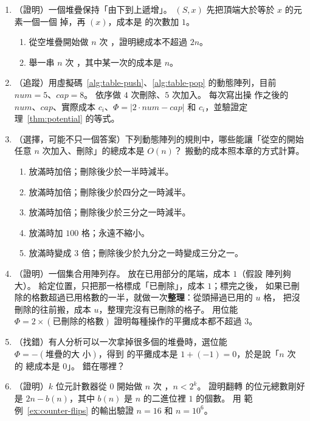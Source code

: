 \begin{enumerate}
\item （證明）一個堆疊保持「由下到上遞增」。 $(S, x)$ 先把頂端大於等於
$x$ 的元素一個一個  掉，再 $(x)$，成本是  的次數加 $1$。
\begin{enumerate}
\item 從空堆疊開始做 $n$ 次 ，證明總成本不超過 $2n$。
\item 舉一串 $n$ 次 ，其中某一次的成本是 $n$。
\end{enumerate}

\item （追蹤）用虛擬碼~\ref{alg:table-push}、\ref{alg:table-pop} 的動態陣列，目前
$\mathit{num} = 5$、$\mathit{cap} = 8$。 依序做 $4$ 次刪除、$5$ 次加入。 每次寫出操
作之後的 $\mathit{num}$、$\mathit{cap}$、實際成本 $c_i$、$\Phi = |2 \cdot \mathit{num}
- \mathit{cap}|$ 和 $\hat{c}_i$，並驗證定理~\ref{thm:potential} 的等式。

\item （選擇，可能不只一個答案）下列動態陣列的規則中，哪些能讓「從空的開始任意 $n$
次加入、刪除」的總成本是 $O(n)$？ 搬動的成本照本章的方式計算。
\begin{enumerate}
\item 放滿時加倍；刪除後少於一半時減半。
\item 放滿時加倍；刪除後少於四分之一時減半。
\item 放滿時加倍；刪除後少於三分之一時減半。
\item 放滿時加 $100$ 格；永遠不縮小。
\item 放滿時變成 $3$ 倍；刪除後少於九分之一時變成三分之一。
\end{enumerate}

\item \label{amo-q-compact}（證明）一個集合用陣列存。  放在已用部分的尾端，成本 $1$（假設
陣列夠大）。  給定位置，只把那一格標成「已刪除」，成本 $1$；標完之後，
如果已刪除的格數超過已用格數的一半，就做一次\textbf{整理}：從頭掃過已用的 $u$ 格，
把沒刪除的往前搬，成本 $u$，整理完沒有已刪除的格子。 用位能
$\Phi = 2 \times (\text{已刪除的格數})$ 證明每種操作的平攤成本都不超過 $3$。

\item （找錯）有人分析可以一次拿掉很多個的堆疊時，選位能 $\Phi = -(\text{堆疊的大
小})$，得到  的平攤成本是 $1 + (-1) = 0$，於是說「$n$ 次  的
總成本是 $0$」。 錯在哪裡？

\item \label{amo-q-bits}（證明）$k$ 位元計數器從 $0$ 開始做 $n$ 次 ，$n < 2^k$。 證明翻轉
的位元總數剛好是 $2n - b(n)$，其中 $b(n)$ 是 $n$ 的二進位裡 $1$ 的個數。 用
範例~\ref{ex:counter-flips} 的輸出驗證 $n = 16$ 和 $n = 10^6$。
\end{enumerate}

